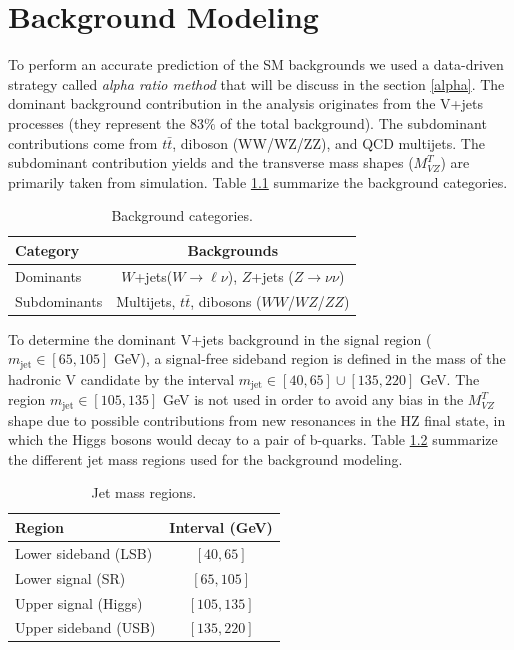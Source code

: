 \chapter{Background Modeling}\label{bkg_estimate}

To perform an accurate prediction of the SM backgrounds we used a data-driven strategy called \emph{alpha ratio method} that will be discuss in the section \ref{alpha}. The dominant background contribution in the analysis  originates from the V+jets processes (they represent the 83$\%$ of the total background). The subdominant contributions come from $t\bar{t}$, diboson (WW/WZ/ZZ), and QCD multijets. The subdominant contribution yields and the transverse mass shapes ($M_{VZ}^{T}$) are primarily taken from simulation. Table \ref{tab:backgrounds} summarize the background categories.

\begin{table}[!ht]
\begin{center}
\caption{Background categories.}
\label{tab:backgrounds}
\begin{tabular}{lc} \hline
Category & Backgrounds \\ \hline
Dominants &  $W$+jets($W \rightarrow \ell \nu$), $Z$+jets ($Z\rightarrow \nu \nu$)  \\
Subdominants   &  Multijets, $t\bar{t}$, dibosons ($WW$/$WZ$/$ZZ$) \\ \hline
\end{tabular}
\end{center}
\end{table}

To determine the dominant V+jets background in the signal region ($m_{\text{jet}} \in \left[65,105 \right]$ GeV), a signal-free sideband region is defined in the mass of the hadronic V candidate by the interval  $m_{\text{jet}} \in \left[40,65 \right] \cup \left[135,220\right]$ GeV. The region $m_{\text{jet}} \in \left[105,135 \right]$ GeV is not used in order to avoid any bias in the $M_{VZ}^{T}$ shape due to possible contributions from new resonances in the HZ final state, in which the Higgs bosons would decay to a pair of b-quarks. Table \ref{tab:jetmassregions} summarize the different jet mass regions used for the background modeling.

\begin{table}[!ht]
\begin{center}
\caption{Jet mass regions.}
\label{tab:jetmassregions}
\begin{tabular}{lc} \hline
Region & Interval (GeV) \\ \hline
Lower sideband  (LSB) &  $\left[40,65 \right]$  \\
Lower signal  (SR)  &  $\left[65,105 \right]$ \\ 
Upper signal (Higgs) & $\left[105,135 \right]$   \\
Upper sideband (USB) & $\left[135,220 \right]$  \\ \hline
\end{tabular}
\end{center}
\end{table}

